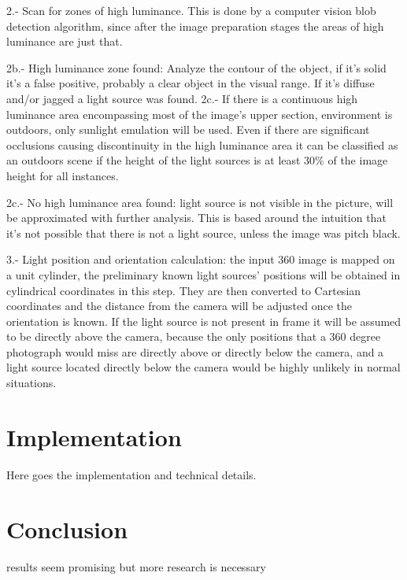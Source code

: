 \documentclass{article}
\begin{document}
2.- Scan for zones of high luminance. This is done by a computer vision blob detection algorithm, since after the image preparation stages the areas of high luminance are just that.

2b.- High luminance zone found: Analyze the contour of the object, if it's solid it's a false positive, probably a clear object in the visual range. If it's diffuse and/or jagged a light source was found. 
2c.- If there is a continuous high luminance area encompassing most of the image's upper section, environment is outdoors, only sunlight emulation will be used. Even if there are significant occlusions causing discontinuity in the high luminance area it can be classified as an outdoors scene if the height of the light sources is at least 30\% of the image height for all instances.

2c.- No high luminance area found: light source is not visible in the picture, will be approximated with further analysis. This is based around the intuition that it's not possible that there is not a light source, unless the image was pitch black.

3.- Light position and orientation calculation: the input 360 image is mapped on a unit cylinder, the preliminary known light sources' positions will be obtained in cylindrical coordinates in this step. They are then converted to Cartesian coordinates and the distance from the camera will be adjusted once the orientation is known. If the light source is not present in frame it will be assumed to be directly above the camera, because the only positions that a 360 degree photograph would miss are directly above or directly below the camera, and a light source located directly below the camera would be highly unlikely in normal situations.


\section{Implementation}
Here goes the implementation and technical details.

\section{Conclusion}
results seem promising but more research is necessary



\end{document}
